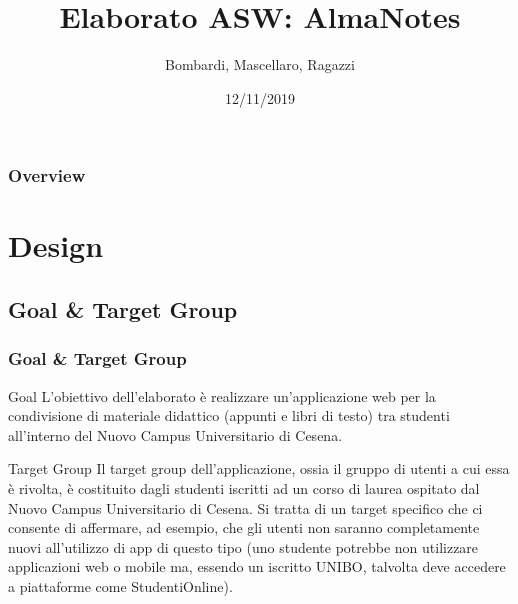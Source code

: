 \documentclass{beamer}
\title[AlmaNotes]{Elaborato ASW: AlmaNotes} %
\author{Bombardi, Mascellaro, Ragazzi} %
\institute[UNIBO] %
{
\medskip
\textbf{Corso di Laurea Magistrale in Ingegneria e Scienze Informatiche} \\ %
\medskip
\medskip
\textbf{Applicazioni e Servizi Web - Elaborato} \\ %
\medskip
}
\date{12/11/2019} %
\begin{document}
\begin{frame}
\titlepage %
\end{frame}

\begin{frame}
\frametitle{Overview} %
\tableofcontents %
\end{frame}


\section{Design}

\subsection{Goal \& Target Group}

\begin{frame}
\frametitle{Goal \& Target Group}
\begin{block}{Goal}
L'obiettivo dell'elaborato è realizzare un'applicazione web per la condivisione di materiale didattico (appunti e libri di testo) tra studenti all’interno del Nuovo Campus Universitario di Cesena.
\end{block}
\begin{block}{Target Group}
Il target group dell'applicazione, ossia il gruppo di utenti a cui essa è rivolta, è costituito dagli studenti iscritti ad un corso di laurea ospitato dal Nuovo Campus Universitario di Cesena. Si tratta di un target specifico che ci consente di affermare, ad esempio, che gli utenti non saranno completamente nuovi all'utilizzo di app di questo tipo (uno studente potrebbe non utilizzare applicazioni web o mobile ma, essendo un iscritto UNIBO, talvolta deve accedere a piattaforme come StudentiOnline).
\end{block}
\end{frame}
\end{document}
